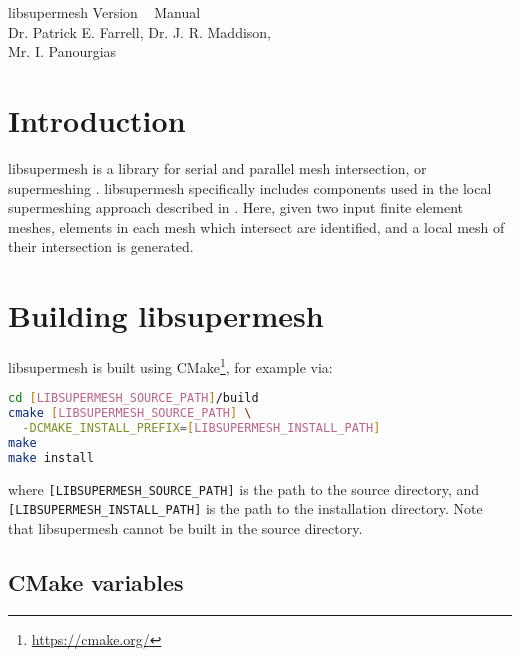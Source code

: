 \documentclass[a4paper]{article}
\begin{document}
\begin{titlepage}
\begin{center}

\Huge{libsupermesh Version \version~ Manual} \\[0.15\textheight]
\Large{Dr. Patrick E. Farrell, Dr. J. R. Maddison, \\ Mr. I. Panourgias}

\end{center}
\end{titlepage}

\tableofcontents

\section{Introduction}

libsupermesh is a library for serial and parallel mesh intersection, or
supermeshing \citep{farrell2009,farrell2009a}. libsupermesh specifically
includes components used in the local supermeshing approach described in
\citet{farrell2011}. Here, given two input finite element meshes, elements in
each mesh which intersect are identified, and a local mesh of their intersection
is generated.

\section{Building libsupermesh}

libsupermesh is built using CMake\footnote{\url{https://cmake.org/}}, for
example via:
\begin{lstlisting}[language = sh, frame = single]
cd [LIBSUPERMESH_SOURCE_PATH]/build
cmake [LIBSUPERMESH_SOURCE_PATH] \
  -DCMAKE_INSTALL_PREFIX=[LIBSUPERMESH_INSTALL_PATH]
make
make install
\end{lstlisting}
where \verb+[LIBSUPERMESH_SOURCE_PATH]+ is the path to the source directory, and
\verb+[LIBSUPERMESH_INSTALL_PATH]+ is the path to the installation directory.
Note that libsupermesh cannot be built in the source directory.

\subsection*{CMake variables}
\end{document}
